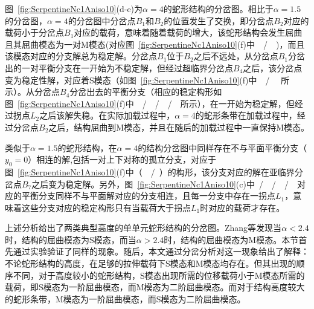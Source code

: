 图~\ref{fig:SerpentineNc1Aniso10}(d-e)为$\alpha=4$的蛇形结构的分岔图。相比于$\alpha=1.5$的分岔图，$\alpha=4$的分岔图中分岔点$B_1$和$B_2$的位置发生了交换，即分岔点$B_2$对应的载荷小于分岔点$B_1$对应的载荷，意味着随着载荷的增大，该蛇形结构会发生屈曲且其屈曲模态为一对M模态(对应图~\ref{fig:SerpentineNc1Aniso10}(f)中~\Btriangle~/~\Rtriangle~)，而且该模态对应的分支解总为稳定解。分岔点$B_1$位于$B_2$之后不远处，从分岔点$B_1$分岔出的一对平衡分支在一开始为不稳定解，但经过超临界分岔点$B_4$之后，该分岔点变为稳定性解，对应着S模态（如图~\ref{fig:SerpentineNc1Aniso10}(f)中~\bluesquare~/~\redsquare~ 所示）。从分岔点$B_4$分岔出去的平衡分支（相应的稳定构形如图~\ref{fig:SerpentineNc1Aniso10}(f)中~\Brighttriangle~/~\Rrighttriangle~/~\Blefttriangle~/~\Rlefttriangle~所示），在一开始为稳定解，但经过拐点$L_2$之后该解失稳。在实际加载过程中，$\alpha=4$的蛇形条带在加载过程中，经过分岔点$B_2$之后，结构屈曲到M模态，并且在随后的加载过程中一直保持M模态。

类似于$\alpha=1.5$的蛇形结构，在$\alpha=4$的结构分岔图中同样存在不与平面平衡分支（$y_0=0$）相连的解,包括一对上下对称的孤立分支，对应于图~\ref{fig:SerpentineNc1Aniso10}(f)中（~\Rdiamond~/~\Bdiamond）的构形，该分支对应的解在亚临界分岔点$B_7$之后变为稳定解。另外，图~\ref{fig:SerpentineNc1Aniso10}(c)中\HBrighttriangle~/~\HRrighttriangle~/~\HBlefttriangle~/~\HRlefttriangle~对应的平衡分支同样不与平面解对应的分支相连，且每一分支中存在一拐点$L_1$，意味着这些分支对应的稳定构形只有当载荷大于拐点$L_1$时对应的载荷才存在。

上述分析给出了两类典型高度的单单元蛇形结构的分岔图。Zhang等\cite{zhang2013buckling}发现当$\alpha<2.4$时，结构的屈曲模态为S模态，而当$\alpha>2.4$时，结构的屈曲模态为M模态。本节首先通过实验验证了同样的现象。随后，本文通过分岔分析对这一现象给出了解释：不论蛇形结构的高度，在足够的拉伸载荷下S模态和M模态均存在。但其出现的顺序不同，对于高度较小的蛇形结构，S模态出现所需的位移载荷小于M模态所需的载荷，即S模态为一阶屈曲模态，而M模态为二阶屈曲模态。而对于结构高度较大的蛇形条带，M模态为一阶屈曲模态，而S模态为二阶屈曲模态。

